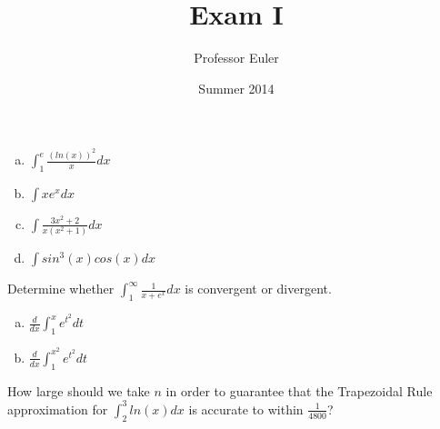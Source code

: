 \documentclass{wit_exam2}
\author{Professor Euler}
\title{Exam I}
\date{Summer 2014}
\begin{document}
\begin{ProblemDefinition}

	\begin{enumerate}[a)]

		\item $\int_1^e{ \frac{ (ln(x))^2 }{ x } dx }$

		\vspace{10.0cm}
		\item{$\int{ x e^x dx }$}

		\newpage

		\item{$\int{ \frac{ 3x^2 + 2 }{ x( x^2 + 1 ) } dx }$}
		
		\vspace{10.0cm}
		\item{$\int{ sin^3(x) cos(x) dx }$}

	\end{enumerate}

\end{ProblemDefinition}


\begin{ProblemDefinition}

	Determine whether $ \int_1^\infty{ \frac{ 1 }{ x + e^x } dx } $ is convergent or divergent.

\end{ProblemDefinition}


\begin{ProblemDefinition}[Find:]

	\begin{enumerate}[a)]
	
		\item $ \frac{d}{dx} \int_1^x{ e^{ t^2 } dt } $
	
		\vspace{10.0cm}
		\item $ \frac{d}{dx} \int_1^{x^2}{ e^{ t^2 } dt } $
	
	\end{enumerate}

\end{ProblemDefinition}

\begin{ProblemDefinition}

	How large should we take $n$ in order to guarantee that the Trapezoidal Rule approximation for $ \int_2^3{ ln(x) dx } $ is accurate to within $\frac{1}{4800}$?

\end{ProblemDefinition}

\end{document}

